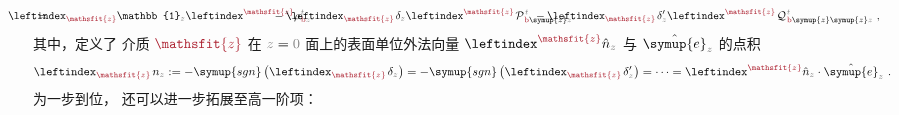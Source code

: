 \begin{subequations}
\begin{align}
	&= &&\hspace{-4.5em}\leftindex_{\textcolor{Maroon}{\mathsfit{z}}} {\mathbb{1}}_{\mathcolor{gray}{z}} \leftindex^{\textcolor{Maroon}{\mathsfit{z}}} {\rho}^{\;\!\mathcolor{gray}{t}}_{\;\!\textcolor{Maroon}{\text{b}}\mathcolor{gray}{z}} &&\hspace{-4.5em}- \leftindex_{\textcolor{Maroon}{\mathsfit{z}}} \;\! \delta_{\mathcolor{gray}{z}} \leftindex^{\textcolor{Maroon}{\mathsfit{z}}} \;\! {\mathcal{P}}^{\;\!\mathcolor{gray}{t}}_{\;\!\textcolor{Maroon}{\text{b}} \symup{z} \mathcolor{gray}{z}} &&\hspace{-4.5em}- \leftindex_{\textcolor{Maroon}{\mathsfit{z}}} \;\! \delta'_{\mathcolor{gray}{z}} \leftindex^{\textcolor{Maroon}{\mathsfit{z}}} \;\! {\mathcal{Q}}^{\;\!\mathcolor{gray}{t}}_{\;\!\textcolor{Maroon}{\text{b}} \symup{z} \symup{z} \mathcolor{gray}{z}} ~, \label{eq:p-b-01}
\end{align}
\end{subequations}
其中，定义了 介质 $\textcolor{Maroon}{\mathsfit{z}}$ 在 $\mathcolor{gray}{z} = \mathcolor{gray}{0}$ 面上的表面单位外法向量 $\leftindex^{\textcolor{Maroon}{\mathsfit{z}}} {\hat{n}}_{\mathcolor{gray}{z}}$ 与 $\hat{\symup{e}}_{\mathcolor{gray}{z}}$ 的点积
\begin{align} \label{eq:surf-normal-dot}
	\leftindex_{\textcolor{Maroon}{\mathsfit{z}}} \;\! n_{\mathcolor{gray}{z}} := - \symup{sgn} \left( \leftindex_{\textcolor{Maroon}{\mathsfit{z}}} \;\! \delta_{\mathcolor{gray}{z}} \right) = - \symup{sgn} \left( \leftindex_{\textcolor{Maroon}{\mathsfit{z}}} \;\! \delta'_{\mathcolor{gray}{z}} \right) = \cdots = \leftindex^{\textcolor{Maroon}{\mathsfit{z}}} {\hat{n}}_{\mathcolor{gray}{z}} \cdot \hat{\symup{e}}_{\mathcolor{gray}{z}}~.
\end{align}
为一步到位， 还可以进一步拓展至高一阶项：

